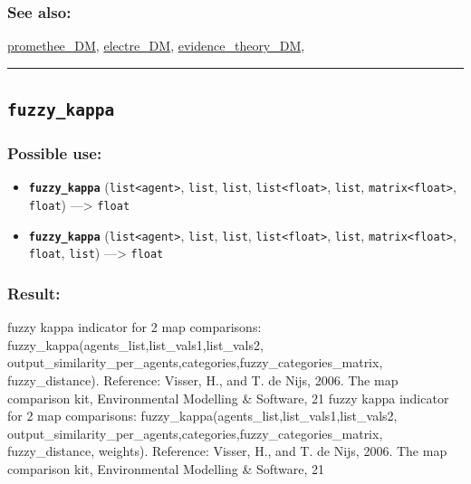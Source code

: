 \documentclass[]{book}
\providecommand{\tightlist}{%
  \setlength{\itemsep}{0pt}\setlength{\parskip}{0pt}}
\theoremstyle{definition}
\theoremstyle{definition}
\theoremstyle{definition}
\theoremstyle{remark}
\begin{document}
\subsubsection{See also:}\label{see-also-100}

\href{operators-n-to-r.html\#promethee_dm}{promethee\_DM},
\href{operators-d-to-h.html\#electre_dm}{electre\_DM},
\href{operators-d-to-h.html\#evidence_theory_dm}{evidence\_theory\_DM},

\begin{center}\rule{0.5\linewidth}{\linethickness}\end{center}

\subsection{\texorpdfstring{\texttt{fuzzy\_kappa}}{fuzzy\_kappa}}\label{fuzzy_kappa}

\subsubsection{Possible use:}\label{possible-use-176}

\begin{itemize}
\tightlist
\item
  \textbf{\texttt{fuzzy\_kappa}}
  (\texttt{list\textless{}agent\textgreater{}}, \texttt{list},
  \texttt{list}, \texttt{list\textless{}float\textgreater{}},
  \texttt{list}, \texttt{matrix\textless{}float\textgreater{}},
  \texttt{float}) ---\textgreater{} \texttt{float}
\item
  \textbf{\texttt{fuzzy\_kappa}}
  (\texttt{list\textless{}agent\textgreater{}}, \texttt{list},
  \texttt{list}, \texttt{list\textless{}float\textgreater{}},
  \texttt{list}, \texttt{matrix\textless{}float\textgreater{}},
  \texttt{float}, \texttt{list}) ---\textgreater{} \texttt{float}
\end{itemize}

\subsubsection{Result:}\label{result-170}

fuzzy kappa indicator for 2 map comparisons:
fuzzy\_kappa(agents\_list,list\_vals1,list\_vals2,
output\_similarity\_per\_agents,categories,fuzzy\_categories\_matrix,
fuzzy\_distance). Reference: Visser, H., and T. de Nijs, 2006. The map
comparison kit, Environmental Modelling \& Software, 21 fuzzy kappa
indicator for 2 map comparisons:
fuzzy\_kappa(agents\_list,list\_vals1,list\_vals2,
output\_similarity\_per\_agents,categories,fuzzy\_categories\_matrix,
fuzzy\_distance, weights). Reference: Visser, H., and T. de Nijs, 2006.
The map comparison kit, Environmental Modelling \& Software, 21
\end{document}
